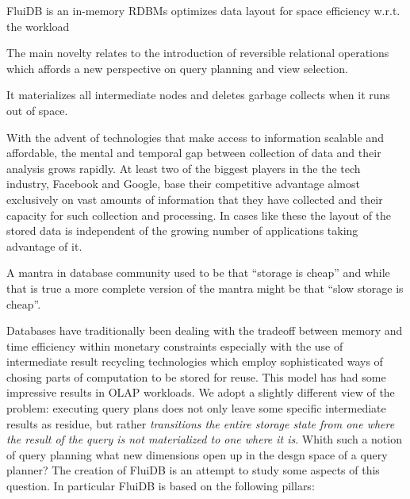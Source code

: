 \begin{summary}
\item FluiDB is an in-memory RDBMs optimizes data layout for space
  efficiency w.r.t. the workload
\item The main novelty relates to the introduction of reversible
  relational operations which affords a new perspective on query
  planning and view selection.
\item It materializes all intermediate nodes and deletes garbage
  collects when it runs out of space.
\end{summary}

%
%
%

With the advent of technologies that make access to information
scalable and affordable, the mental and temporal gap between
collection of data and their analysis grows rapidly. At least two of
the biggest players in the the tech industry, Facebook and Google,
base their competitive advantage almost exclusively on vast amounts of
information that they have collected and their capacity for such
collection and processing. In cases like these the layout of the
stored data is independent of the growing number of applications
taking advantage of it.

A mantra in database community used to be that ``storage is cheap''
and while that is true a more complete version of the mantra might be
that ``slow storage is cheap''.

Databases have traditionally been dealing with the tradeoff between
memory and time efficiency within monetary constraints especially with
the use of intermediate result recycling technologies which employ
sophisticated ways of chosing parts of computation to be stored for
reuse. This model has had some impressive results in OLAP
workloads. We adopt a slightly different view of the problem:
executing query plans does not only leave some specific intermediate
results as residue, but rather \emph{transitions the entire storage
  state from one where the result of the query is not materialized to
  one where it is}. Whith such a notion of query planning what new
dimensions open up in the desgn space of a query planner? The creation
of FluiDB is an attempt to study some aspects of this question. In
particular FluiDB is based on the following pillars:

